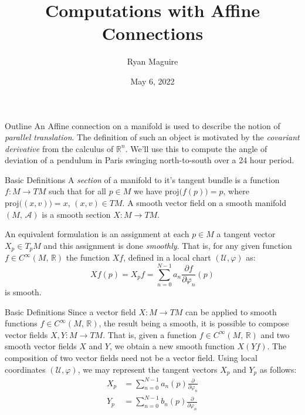 \documentclass{beamer}
\title{Computations with Affine Connections}
\author{Ryan Maguire}
\date{May 6, 2022}
\begin{document}
    \maketitle
    \begin{frame}{Outline}
        An Affine connection on a manifold is used to describe the notion of
        \textit{parallel translation}. The definition of such an object is
        motivated by the \textit{covariant derivative} from the calculus of
        $\mathbb{R}^{n}$. We'll use this to compute the angle of deviation of
        a pendulum in Paris swinging north-to-south over a 24 hour period.
    \end{frame}
    \begin{frame}{Basic Definitions}
        A \textit{section} of a manifold to it's tangent bundle is a function
        $f:M\rightarrow{TM}$ such that for all $p\in{M}$ we have
        $\textrm{proj}\big(f(p)\big)=p$, where
        $\textrm{proj}\big((x,v)\big)=x$, $(x,v)\in{TM}$.
        A smooth vector field on a smooth manifold $(M,\,\mathcal{A})$ is a
        smooth section $X:M\rightarrow{TM}$.
        \par\hfill\par
        An equivalent formulation is an assignment at each $p\in{M}$ a
        tangent vector $X_{p}\in{T}_{p}M$ and this assignment is done
        \textit{smoothly}. That is, for any given function
        $f\in{C}^{\infty}(M,\,\mathbb{R})$ the function $Xf$, defined in a
        local chart $(\mathcal{U},\varphi)$ as:
        \begin{equation}
            Xf(p)=X_{p}f
                =\sum_{n=0}^{N-1}a_{n}\frac{\partial{f}}{\partial\varphi_{n}}(p)
        \end{equation}
        is smooth.
    \end{frame}
    \begin{frame}{Basic Definitions}
        Since a vector field $X:M\rightarrow{TM}$ can be applied to smooth
        functions $f\in{C}^{\infty}(M,\,\mathbb{R})$, the result being
        a smooth, it is possible to compose vector fields
        $X,Y:M\rightarrow{TM}$. That is, given a function
        $f\in{C}^{\infty}(M,\,\mathbb{R})$ and two smooth vector fields $X$ and
        $Y$, we obtain a new smooth function $X(Yf)$. The composition of two
        vector fields need not be a vector field. Using local
        coordinates $(\mathcal{U},\varphi)$, we may represent the tangent
        vectors $X_{p}$ and $Y_{p}$ as follows:
        \begin{align}
            X_{p}&=\sum_{n=0}^{N-1}a_{n}(p)\frac{\partial}{\partial\varphi_{n}}\\
            Y_{p}&=\sum_{n=0}^{N-1}b_{n}(p)\frac{\partial}{\partial\varphi_{n}}
        \end{align}
    \end{frame}
\end{document}
